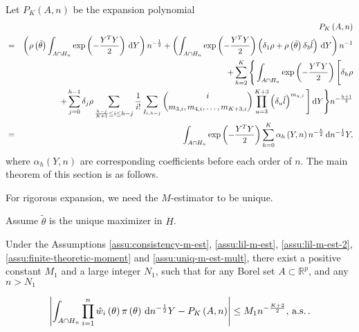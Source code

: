 \begin{comment}
the formula is wrong, need a new one. 
\end{comment}
Let $P_{K}\left(A,n\right)$ be the expansion polynomial 
\begin{eqnarray*}
 &  & P_{K}\left(A,n\right)\\
 & = & \left(\rho\left(\tilde{\theta}\right)\int_{A\cap H_{n}}\exp\left(-\frac{Y^{T}Y}{2}\right)\,\mathrm{d} Y\right)n^{-\frac{1}{2}}+\left(\int_{A\cap H_{n}}\exp\left(-\frac{Y^{T}Y}{2}\right)\left(\delta_{1}\rho+\rho\left(\tilde{\theta}\right)\delta_{3}\hat{l}\right)\,\mathrm{d} Y\right)n^{-1}\\
 &  & +\sum_{h=2}^{K}\Bigg\{\int_{A\cap H_{n}}\exp\left(-\frac{Y^{T}Y}{2}\right)\Bigg[\delta_{h}\rho\\
 &  & +\sum_{j=0}^{h-1}\delta_{j}\rho\sum_{\frac{h-j}{K+1}\le i\le h-j}\frac{1}{i!}\sum_{I_{i,h-j}}\binom{i}{m_{3,i},m_{4,i},\ldots,m_{K+3,i}}\prod_{u=3}^{K+3}\left(\delta_{u}\hat{l}\right)^{m_{u,i}}\Bigg]\,\mathrm{d} Y\Bigg\} n^{-\frac{h+1}{2}}\\
 & = & \int_{A\cap H_{n}}\exp\left(-\frac{Y^{T}Y}{2}\right)\sum_{h=0}^{K}\alpha_{h}\left(Y,n\right)n^{-\frac{h}{2}}\,\mathrm{d} n^{-\frac{1}{2}}Y,
\end{eqnarray*}
where $\alpha_{h}\left(Y,n\right)$ are corresponding coefficients
before each order of $n$. %
The main theorem of this section is as follows.
\begin{comment}
add normal case and multivariate case
\end{comment}
For rigorous expansion, we need the $M$-estimator to be unique.
\begin{assumption}
\label{assu:uniq-m-est-mult}
Assume $\tilde{\theta}$ is the unique maximizer in $H$.
\end{assumption}
\begin{thm}
\label{thm:main-theorem-2}Under the Assumptions \ref{assu:consistency-m-est}, \ref{assu:lil-m-est}, \ref{assu:lil-m-est-2},  
\ref{assu:finite-theoretic-moment} and \ref{assu:uniq-m-est-mult},
there exist a positive constant $M_{1}$ and a large integer $N_{1}$,
such that for any Borel set $A\subset\mathbb{R}^{p}$, and any $n>N_{1}$%
\begin{comment}
add subscript to constant
\end{comment}
{} 
\[
\left|\int_{A\cap H_{n}}\prod_{i=1}^{n}\hat{w}_{i}\left(\theta\right)\pi\left(\theta\right)\,\mathrm{d} n^{-\frac{1}{2}}Y-P_{K}\left(A,n\right)\right|\le M_{1}n^{-\frac{K+2}{2}},\,\mathrm{a.s.}\,.
\]

\end{thm}
